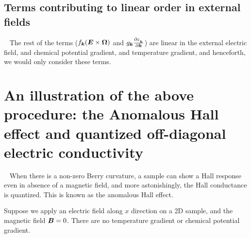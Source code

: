 \documentclass{report}
\renewcommand\vec[1]{\ensuremath\boldsymbol{#1}} %
\begin{document}
\subsection{Terms contributing to linear order in external fields}~\label{sec:linearCont}
The rest of the terms ($ {f}_{\vec{k}} (\vec{E}\times\vec{\Omega}) $ and ${g}_{\vec{k}} \frac{\partial \varepsilon_{_{\vec{k}}}}{\partial \vec{k}}$) are linear in the external electric field, and chemical potential gradient, and temperature gradient, and henceforth, we would only consider these terms.
\section{An illustration of the above procedure: the Anomalous Hall effect and quantized off-diagonal electric conductivity}~\label{sec:AHE}
When there is a non-zero Berry curvature, a sample can show a Hall response even in absence of a magnetic field, and more astonishingly, the Hall conductance is quantized. This is known as the anomalous Hall effect.

Suppose we apply an electric field along $x$ direction on a 2D sample, and the magnetic field $\vec{B} = 0$. There are no temperature gradient or chemical potential gradient.
\end{document}

